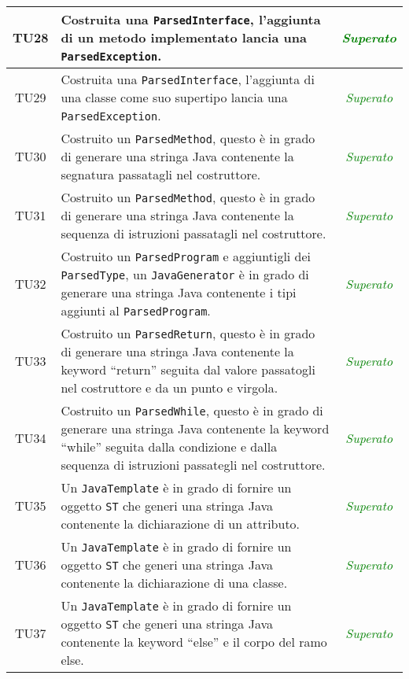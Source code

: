 \begin{longtable}{|c|>{}m{8cm}|c|}
\hypertarget{TU28}{TU28} & Costruita una \texttt{ParsedInterface}, l'aggiunta di un metodo implementato lancia una \texttt{ParsedException}. & \textcolor{Green}{\textit{Superato}}\\ \hline
\hypertarget{TU29}{TU29} & Costruita una \texttt{ParsedInterface}, l'aggiunta di una classe come suo supertipo lancia una \texttt{ParsedException}. & \textcolor{Green}{\textit{Superato}}\\ \hline
\hypertarget{TU30}{TU30} & Costruito un \texttt{ParsedMethod}, questo è in grado di generare una stringa Java contenente la segnatura passatagli nel costruttore. & \textcolor{Green}{\textit{Superato}}\\ \hline
\hypertarget{TU31}{TU31} & Costruito un \texttt{ParsedMethod}, questo è in grado di generare una stringa Java contenente la sequenza di istruzioni passatagli nel costruttore. & \textcolor{Green}{\textit{Superato}}\\ \hline
\hypertarget{TU32}{TU32} & Costruito un \texttt{ParsedProgram} e aggiuntigli dei \texttt{ParsedType}, un \texttt{JavaGenerator} è in grado di generare una stringa Java contenente i tipi aggiunti al \texttt{ParsedProgram}. & \textcolor{Green}{\textit{Superato}}\\ \hline
\hypertarget{TU33}{TU33} & Costruito un \texttt{ParsedReturn}, questo è in grado di generare una stringa Java contenente la keyword ``return'' seguita dal valore passatogli nel costruttore e da un punto e virgola. & \textcolor{Green}{\textit{Superato}}\\ \hline
\hypertarget{TU34}{TU34} & Costruito un \texttt{ParsedWhile}, questo è in grado di generare una stringa Java contenente la keyword ``while'' seguita dalla condizione e dalla sequenza di istruzioni passategli nel costruttore. & \textcolor{Green}{\textit{Superato}}\\ \hline
\hypertarget{TU35}{TU35} & Un \texttt{JavaTemplate} è in grado di fornire un oggetto \texttt{ST} che generi una stringa Java contenente la dichiarazione di un attributo. & \textcolor{Green}{\textit{Superato}}\\ \hline
\hypertarget{TU36}{TU36} & Un \texttt{JavaTemplate} è in grado di fornire un oggetto \texttt{ST} che generi una stringa Java contenente la dichiarazione di una classe. & \textcolor{Green}{\textit{Superato}}\\ \hline
\hypertarget{TU37}{TU37} & Un \texttt{JavaTemplate} è in grado di fornire un oggetto \texttt{ST} che generi una stringa Java contenente la keyword ``else'' e il corpo del ramo else. & \textcolor{Green}{\textit{Superato}}\\ \hline

\end{longtable}
